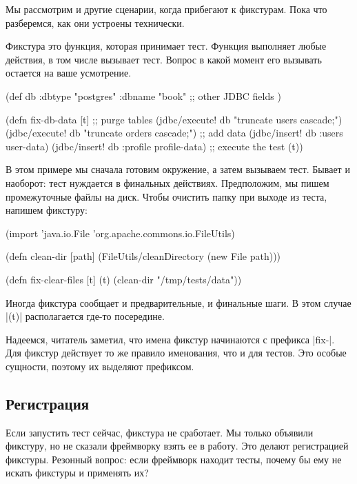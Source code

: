 Мы рассмотрим и другие сценарии, когда прибегают к фикстурам. Пока что
разберемся, как они устроены технически.

Фикстура это функция, которая принимает тест. Функция выполняет любые действия,
в том числе вызывает тест. Вопрос в какой момент его вызывать остается на ваше
усмотрение.

\begin{english}
  \begin{clojure}
(def db {:dbtype "postgres" :dbname "book"
         ;; other JDBC fields
         })

(defn fix-db-data [t]
  ;; purge tables
  (jdbc/execute! db "truncate users cascade;")
  (jdbc/execute! db "truncate orders cascade;")
  ;; add data
  (jdbc/insert! db :users user-data)
  (jdbc/insert! db :profile profile-data)
  ;; execute the test
  (t))
  \end{clojure}
\end{english}

В этом примере мы сначала готовим окружение, а затем вызываем тест. Бывает и
наоборот: тест нуждается в финальных действиях. Предположим, мы пишем
промежуточные файлы на диск. Чтобы очистить папку при выходе из теста, напишем
фикстуру:

\begin{english}
  \begin{clojure}
(import 'java.io.File
        'org.apache.commons.io.FileUtils)

(defn clean-dir [path]
  (FileUtils/cleanDirectory (new File path)))

(defn fix-clear-files [t]
  (t)
  (clean-dir "/tmp/tests/data"))
  \end{clojure}
\end{english}

Иногда фикстура сообщает и предварительные, и финальные шаги. В этом случае
\spverb|(t)| располагается где-то посередине.

Надеемся, читатель заметил, что имена фикстур начинаются с префикса
\spverb|fix-|. Для фикстур действует то же правило именования, что и для
тестов. Это особые сущности, поэтому их выделяют префиксом.

\subsection{Регистрация}

Если запустить тест сейчас, фикстура не сработает. Мы только объявили фикстуру,
но не сказали фреймворку взять ее в работу. Это делают регистрацией фикстуры.
Резонный вопрос: если фреймворк находит тесты, почему бы ему не искать фикстуры
и применять их?

